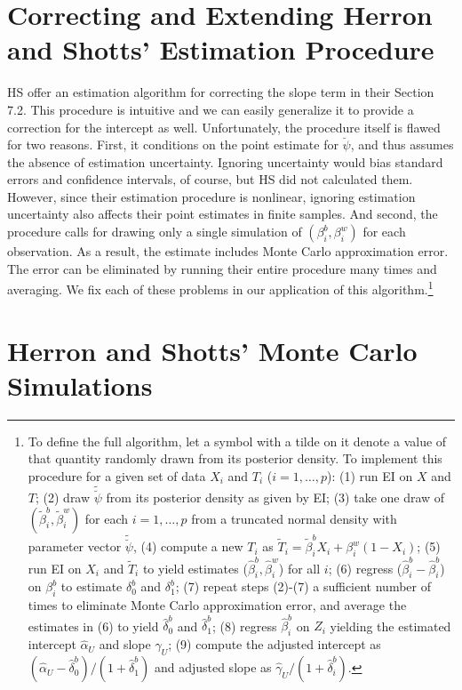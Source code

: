 \documentclass[11pt,titlepage]{article}
\newcommand{\psiu}{\breve{\psi}}
\begin{document}
\section{Correcting and Extending Herron and Shotts' Estimation
  Procedure}

HS offer an estimation algorithm for correcting the slope term in
their Section 7.2.  This procedure is intuitive and we can easily
generalize it to provide a correction for the intercept as well.
Unfortunately, the procedure itself is flawed for two reasons.  First,
it conditions on the point estimate for $\breve\psi$, and thus assumes
the absence of estimation uncertainty.  Ignoring uncertainty would
bias standard errors and confidence intervals, of course, but HS did
not calculated them.  However, since their estimation procedure is
nonlinear, ignoring estimation uncertainty also affects their point
estimates in finite samples.  And second, the procedure calls for
drawing only a single simulation of $(\beta_i^b,\beta_i^w)$ for each
observation.  As a result, the estimate includes Monte Carlo
approximation error.  The error can be eliminated by running their
entire procedure many times and averaging.  We fix each of these
problems in our application of this algorithm.\footnote{To define the
  full algorithm, let a symbol with a tilde on it denote a value of
  that quantity randomly drawn from its posterior density.  To
  implement this procedure for a given set of data $X_i$ and $T_i$
  ($i=1,\dots,p$): (1) run EI on $X$ and $T$; (2) draw $\tilde\psiu$
  from its posterior density as given by EI; (3) take one draw of
  $(\tilde\beta_i^b,\tilde\beta_i^w)$ for each $i=1,\dots,p$ from a
  truncated normal density with parameter vector $\tilde\psiu$, (4)
  compute a new $T_i$ as $\tilde
  T_i=\tilde\beta_i^bX_i+\beta_i^w(1-X_i)$; (5) run EI on $X_i$ and
  $\tilde T_i$ to yield estimates ($\hat\beta_i^b,\hat\beta_i^w$) for
  all $i$; (6) regress ($\hat\beta_i^b-\hat\beta_i^b$) on $\beta_i^b$
  to estimate $\delta_0^b$ and $\delta_1^b$; (7) repeat steps (2)-(7)
  a sufficient number of times to eliminate Monte Carlo approximation
  error, and average the estimates in (6) to yield $\hat\delta_0^b$
  and $\hat\delta_1^b$; (8) regress $\hat\beta_i^b$ on $Z_i$ yielding
  the estimated intercept $\hat\alpha_U$ and slope $\hat\gamma_U$; (9)
  compute the adjusted intercept as
  $(\hat\alpha_U-\hat\delta_0^b)/(1+\hat\delta_1^b)$ and adjusted
  slope as $\hat\gamma_U/(1+\hat\delta_i^b)$.}

\section{Herron and Shotts' Monte Carlo Simulations}
\end{document}

